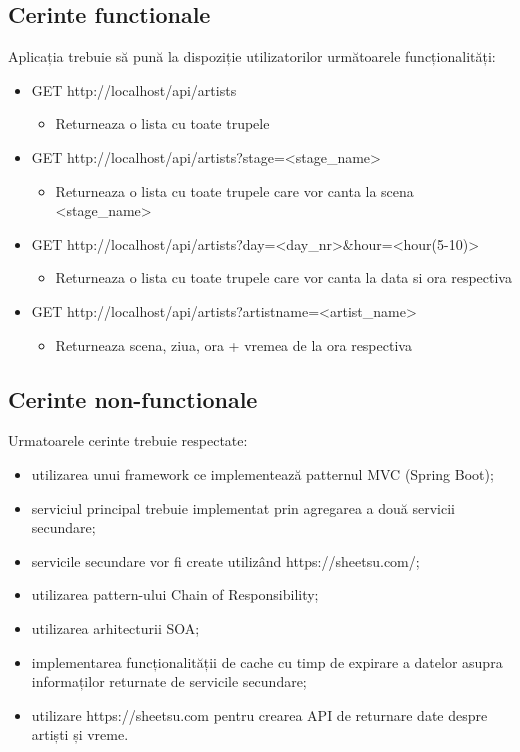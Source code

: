 \documentclass[11pt,a4paper,twoside,notitlepage]{article}
\begin{document}
\subsection{Cerinte functionale}
Aplicația trebuie să pună la dispoziție utilizatorilor următoarele funcționalități:
\begin{itemize}
	\item GET http://localhost/api/artists
		\begin{itemize}
			\item Returneaza o lista cu toate trupele
		\end{itemize}
	\item GET http://localhost/api/artists?stage=\textless stage\_name\textgreater
		\begin{itemize}
			\item Returneaza o lista cu toate trupele care vor canta la scena \textless stage\_name\textgreater
		\end{itemize}
	\item GET http://localhost/api/artists?day=\textless day\_nr\textgreater\&hour=\textless hour(5-10)\textgreater
		\begin{itemize}
			\item Returneaza o lista cu toate trupele care vor canta la data si ora respectiva
		\end{itemize}
	\item GET http://localhost/api/artists?artistname=\textless artist\_name\textgreater
		\begin{itemize}
			\item Returneaza scena, ziua, ora + vremea de la ora respectiva

		\end{itemize}
\end{itemize}

\subsection{Cerinte non-functionale}
Urmatoarele cerinte trebuie respectate:
\begin{itemize}
	\item 	utilizarea unui framework ce implementează patternul MVC (Spring Boot);
	\item	serviciul principal trebuie implementat prin agregarea a două servicii secundare;
	\item 	servicile secundare vor fi create utiliz\^{a}nd https://sheetsu.com/;
	\item 	utilizarea pattern-ului Chain of Responsibility;
	\item	utilizarea arhitecturii SOA;
	\item 	implementarea funcționalității de cache cu timp de expirare a datelor asupra informaților returnate de servicile secundare;
	\item 	utilizare https://sheetsu.com pentru crearea API de returnare date despre artiști și vreme.
\end{itemize}
\end{document}
